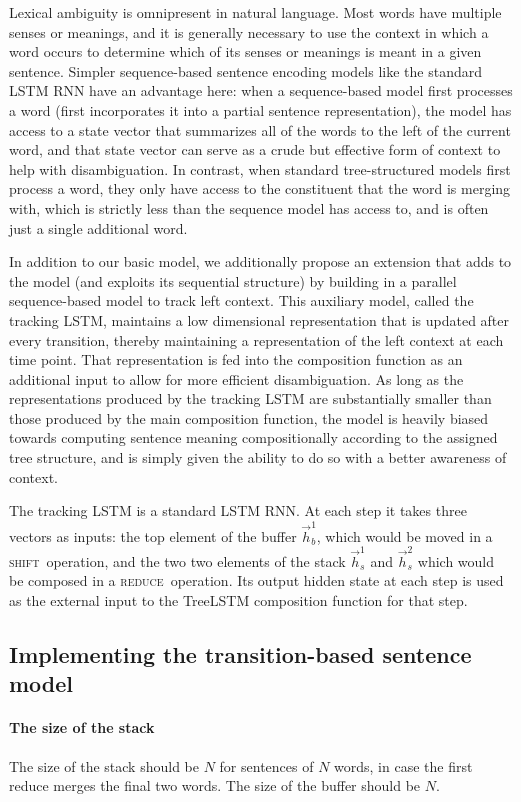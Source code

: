 \documentclass[11pt,letterpaper]{article}
\newcommand{\shift}{\textsc{shift}}
\newcommand{\reduce}{\textsc{reduce}}
\begin{document}
Lexical ambiguity is omnipresent in natural language. Most words have multiple senses or meanings, and it is generally necessary to use the context in which a word occurs to determine which of its senses or meanings is meant in a given sentence. Simpler sequence-based sentence encoding models like the standard LSTM RNN have an advantage here: when a sequence-based model first processes a word (first incorporates it into a partial sentence representation), the model has access to a state vector that summarizes all of the words to the left of the current word, and that state vector can serve as a crude but effective form of context to help with disambiguation. In contrast, when standard tree-structured models first process a word, they only have access to the constituent that the word is merging with, which is strictly less than the sequence model has access to, and is often just a single additional word. 

In addition to our basic model, we additionally propose an extension that adds to the model (and exploits its sequential structure) by building in a parallel sequence-based model to track left context. This auxiliary model, called the tracking LSTM, maintains a low dimensional representation that is updated after every transition, thereby maintaining a representation of the left context at each time point. That representation is fed into the composition function as an additional input to allow for more efficient disambiguation. As long as the representations produced by the tracking LSTM are substantially smaller than those produced by the main composition function, the model is heavily biased towards computing sentence meaning compositionally according to the assigned tree structure, and is simply given the ability to do so with a better awareness of context.

The tracking LSTM is a standard LSTM RNN. At each step it takes three vectors as inputs: the top element of the buffer $\vec{h}_b^1$, which would be moved in a \shift~operation, and the two two elements of the stack $\vec{h}_s^1$ and $\vec{h}_s^2$ which would be composed in a \reduce~operation. Its output hidden state at each step is used as the external input to the TreeLSTM composition function for that step.

\subsection{Implementing the transition-based sentence model}

\paragraph{The size of the stack}
The size of the stack should be $N$ for sentences of $N$ words, in case the first reduce merges the final two words. The size of the buffer should be $N$.
\end{document}
